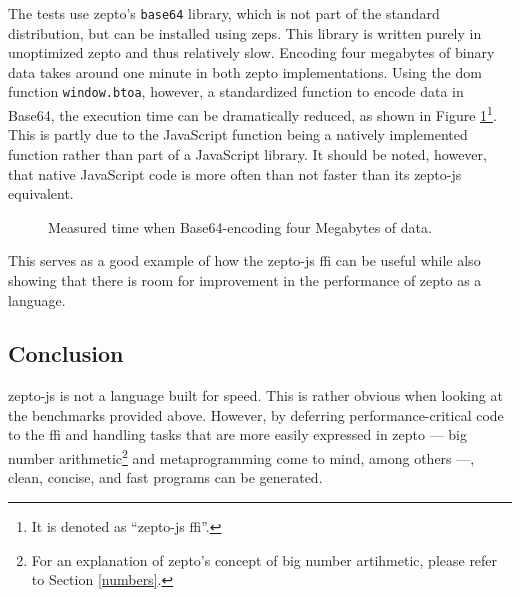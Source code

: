 \documentclass[oneside,11pt,xetex]{scrbook}
\begin{document}
The tests use zepto's \texttt{base64} library, which is not part of the
standard distribution, but can be installed using \gls{zeps}. This library
is written purely in unoptimized zepto and thus relatively slow. Encoding four
megabytes of binary data takes around one minute in both zepto implementations.
Using the \gls{dom} function \texttt{window.btoa}, however, a standardized function
to encode data in Base64, the execution time  can be dramatically reduced, as shown
in Figure \ref{fig:base64}\footnote{It is denoted as ``zepto-js \gls{ffi}''.}. This
is partly due to the JavaScript function being a natively implemented function rather
than part of a JavaScript library. It should be noted, however, that native JavaScript
code is more often than not faster than its zepto-js equivalent.

\begin{figure}
\centering
  \caption{Measured time when Base64-encoding four Megabytes of data.}
  \label{fig:base64}
\end{figure}

This serves as a good example of how the zepto-js \gls{ffi} can be useful while
also showing that there is room for improvement in the performance of zepto as
a language.

\subsection{Conclusion}

zepto-js is not a language built for speed. This is rather obvious when looking
at the benchmarks provided above. However, by deferring performance-critical code
to the \gls{ffi} and handling tasks that are more easily expressed in zepto ---
big number arithmetic\footnote{For an explanation of zepto's concept of big number
artihmetic, please refer to Section \ref{numbers}.} and metaprogramming come to
mind, among others ---, clean, concise, and fast programs can be generated.
\end{document}
